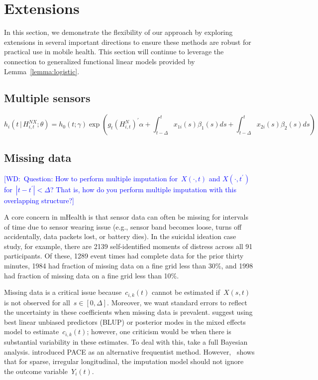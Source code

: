 \documentclass[11pt]{amsart}
\newcommand{\walt}[1]{\textcolor{blue}{[WD:\ #1]}}
\def\given{\, | \,}
\begin{document}
\section{Extensions}

In this section, we demonstrate the flexibility of our approach by exploring extensions in several important directions to ensure these methods are robust for practical use in mobile health. This section will continue to leverage the connection to generalized functional linear models provided by Lemma~\ref{lemma:logistic}.

\subsection{Multiple sensors}
\label{section:multiplesensors}

\begin{equation}
\label{eq:multihazardlinear}
h_i \left( t \given  H_{i,t}^{NX} ; \theta \right) =
h_0 (t; \gamma) \exp \left( g_t \left( H_{i,t}^{N} \right)^{\prime} \alpha
  + \int_{t-\Delta}^t x_{1i} (s) \beta_1(s) ds + \int_{t-\Delta}^t x_{2i} (s) \beta_2(s) ds  \right)
\end{equation}

\subsection{Missing data}
\label{section:missingdata}
\walt{Question: How to perform multiple imputation for~$X(\cdot,t)$
  and $X(\cdot, t^\prime)$ for~$|t - t^\prime| <\Delta$? That is, how
  do you perform multiple imputation with this overlapping structure?}

A core concern in mHealth is that sensor data can often be missing for intervals of time due to sensor wearing issue (e.g., sensor band becomes loose, turns off accidentally, data packets lost, or battery dies). In the suicidal ideation case study, for example, there are 2139 self-identified moments of distress across all 91 participants. Of these, 1289 event times had complete data for the prior thirty minutes, 1984 had fraction of missing data on a fine grid less than 30\%, and 1998 had fraction of missing data on a fine grid less than 10\%.

Missing data is a critical issue because~$c_{i,k} (t)$ cannot be estimated if~$X(s,t)$ is not observed for all~$s \in [0,\Delta]$. Moreover, we want standard errors to reflect the uncertainty in these coefficients when missing data is prevalent. \cite{Goldsmith2011} suggest using best linear unbiased predictors (BLUP) or posterior modes in the mixed effects model to estimate~$c_{i,k} (t)$; however, one criticism would be when there is substantial variability in these estimates.  To deal with this, \cite{Crainiceanu2010} take a full Bayesian analysis. \cite{Yao2005} introduced PACE as an alternative frequentist method. However,~\cite{Petrovich2018} shows that for sparse, irregular longitudinal, the imputation model should not ignore the outcome variable~$Y_i (t)$.
\end{document}
